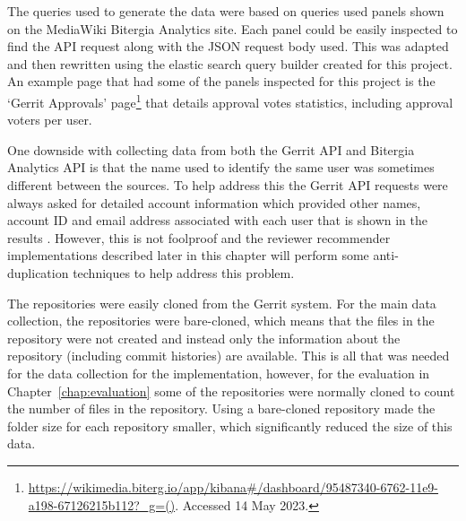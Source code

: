 The queries used to generate the data were based on queries used panels shown on the MediaWiki Bitergia Analytics site. Each panel could be easily inspected to find the API request along with the JSON request body used. This was adapted and then rewritten using the elastic search query builder created for this project. An example page that had some of the panels inspected for this project is the `Gerrit Approvals' page\footnote{\url{https://wikimedia.biterg.io/app/kibana\#/dashboard/95487340-6762-11e9-a198-67126215b112?\_g=()}. Accessed 14 May 2023.} that details approval votes statistics, including approval voters per user.

One downside with collecting data from both the Gerrit API and Bitergia Analytics API is that the name used to identify the same user was sometimes different between the sources. To help address this the Gerrit API requests were always asked for detailed account information which provided other names, account ID and email address associated with each user that is shown in the results \citep{mediawiki-gerrit:changes-rest-api-detailed-accounts}. However, this is not foolproof and the reviewer recommender implementations described later in this chapter will perform some anti-duplication techniques to help address this problem.

The repositories were easily cloned from the Gerrit system. For the main data collection, the repositories were bare-cloned, which means that the files in the repository were not created and instead only the information about the repository (including commit histories) are available. This is all that was needed for the data collection for the implementation, however, for the evaluation in Chapter~\ref{chap:evaluation} some of the repositories were normally cloned to count the number of files in the repository. Using a bare-cloned repository made the folder size for each repository smaller, which significantly reduced the size of this data.

